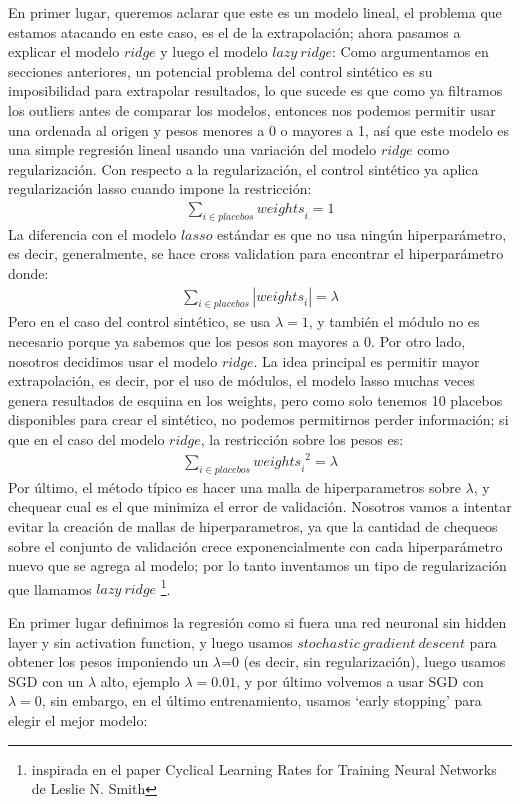 \documentclass[12pt]{article}
\begin{document}
En primer lugar, queremos aclarar que este es un modelo lineal, el problema que estamos atacando en este caso, es el de la extrapolación; ahora pasamos a explicar el modelo {$ridge$} y luego el modelo {$lazy \ ridge$}:
Como argumentamos en secciones anteriores, un potencial problema del control sintético es su imposibilidad para extrapolar resultados, lo que sucede es que como ya filtramos los outliers antes de comparar los modelos, entonces nos podemos permitir usar una ordenada al origen y pesos menores a 0 o mayores a 1, así que este modelo es una simple regresión lineal usando una variación del modelo {$ridge$} como regularización. 
Con respecto a la regularización, el control sintético ya aplica regularización lasso cuando impone la restricción:
\begin{align*}
    \sum_{i\in p l a c e b o s}{weights}_i=1
\end{align*}
La diferencia con el modelo {$lasso$} estándar es que no usa ningún hiperparámetro, es decir, generalmente, se hace cross validation para encontrar el hiperparámetro  donde:
\begin{align*}
    \sum_{i\in p l a c e b o s}\left|{weights}_i\right|=\lambda
\end{align*}
Pero en el caso del control sintético, se usa {$\lambda=1$}, y también el módulo no es necesario porque ya sabemos que los pesos son mayores a 0.
Por otro lado, nosotros decidimos usar el modelo  {$ridge$}. La idea principal es permitir mayor extrapolación, es decir, por el uso de módulos, el modelo lasso muchas veces genera resultados de esquina en los weights, pero como solo tenemos 10 placebos disponibles para crear el sintético, no podemos permitirnos perder información; si que en el caso del modelo  {$ridge$}, la restricción sobre los pesos es:
\begin{align*}
    \sum_{i\in p l a c e b o s}{{weights}_i}^2=\lambda
\end{align*}
Por último, el método típico es hacer una malla de hiperparametros sobre {$\lambda$}, y chequear cual es el  que minimiza el error de validación. Nosotros vamos a intentar evitar la creación de mallas de hiperparametros, ya que la cantidad de chequeos sobre el conjunto de validación crece exponencialmente con cada hiperparámetro nuevo que se agrega al modelo; por lo tanto inventamos un tipo de regularización que llamamos {$lazy \ ridge$} \footnote{inspirada en el paper Cyclical Learning Rates for Training Neural Networks de Leslie N. Smith }.

En primer lugar definimos la regresión como si fuera una red neuronal sin hidden layer y sin activation function, y luego usamos {$stochastic \ gradient \ descent$} para obtener los pesos imponiendo un {$\lambda$}=0 (es decir, sin regularización), luego usamos SGD con un  {$\lambda$} alto, ejemplo {$\lambda=0.01$}, y por último volvemos a usar SGD con {$\lambda=0$}, sin embargo, en el último entrenamiento, usamos ‘early stopping’ para elegir el mejor modelo:
\end{document}
